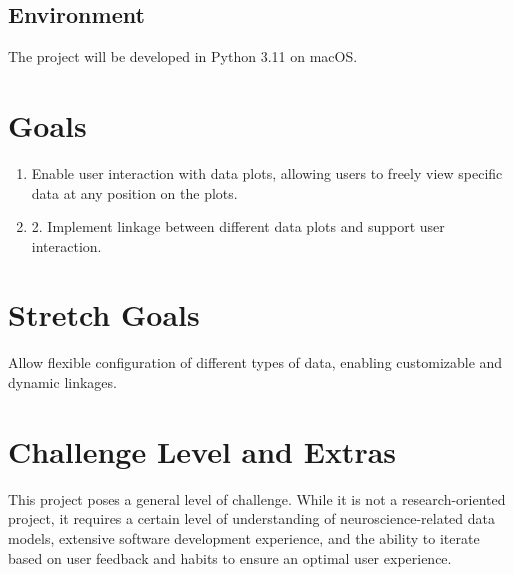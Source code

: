 \documentclass{article}
\begin{document}
\subsection{Environment}
The project will be developed in Python 3.11 on macOS.


\section{Goals}
\begin{enumerate}
    \item Enable user interaction with data plots, allowing users to freely view specific data at any position on the plots.
    \item 2. Implement linkage between different data plots and support user interaction.
\end{enumerate}
\section{Stretch Goals}
Allow flexible configuration of different types of data, enabling customizable and dynamic linkages.
\section{Challenge Level and Extras}

This project poses a general level of challenge. While it is not a research-oriented project, it requires a certain level of understanding of neuroscience-related data models, extensive software development experience, and the ability to iterate based on user feedback and habits to ensure an optimal user experience.
\end{document}
